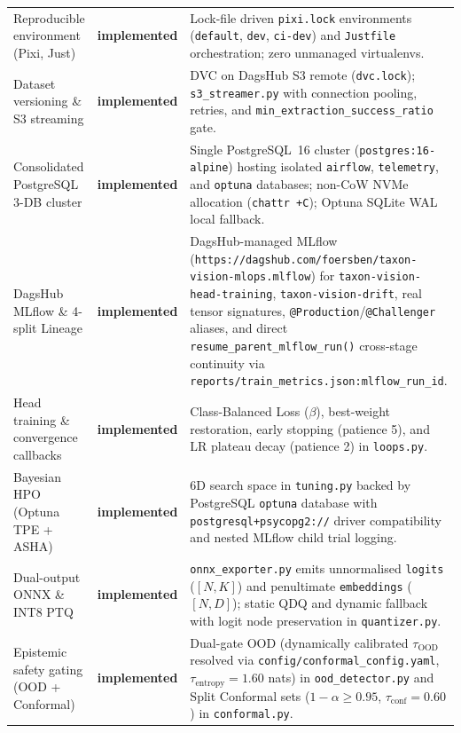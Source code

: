 \begin{longtable}{@{}p{} p{} p{}@{}}
Reproducible environment (Pixi, Just) & \textbf{implemented} & Lock-file driven \texttt{pixi.lock} environments (\texttt{default}, \texttt{dev}, \texttt{ci-dev}) and \texttt{Justfile} orchestration; zero unmanaged virtualenvs. \\
\addlinespace
Dataset versioning \& S3 streaming & \textbf{implemented} & DVC on DagsHub S3 remote (\texttt{dvc.lock}); \texttt{s3\_streamer.py} with connection pooling, retries, and \texttt{min\_extraction\_success\_ratio} gate. \\
\addlinespace
Consolidated PostgreSQL 3-DB cluster & \textbf{implemented} & Single PostgreSQL~16 cluster (\texttt{postgres:16-alpine}) hosting isolated \texttt{airflow}, \texttt{telemetry}, and \texttt{optuna} databases; non-CoW NVMe allocation (\texttt{chattr +C}); Optuna SQLite WAL local fallback. \\
\addlinespace
DagsHub MLflow \& 4-split Lineage & \textbf{implemented} & DagsHub-managed MLflow (\nolinkurl{https://dagshub.com/foersben/taxon-vision-mlops.mlflow}) for \texttt{taxon-vision-head-training}, \texttt{taxon-vision-drift}, real tensor signatures, \texttt{@Production}/\texttt{@Challenger} aliases, and direct \nolinkurl{resume_parent_mlflow_run()} cross-stage continuity via \nolinkurl{reports/train_metrics.json:mlflow_run_id}. \\
\addlinespace
Head training \& convergence callbacks & \textbf{implemented} & Class-Balanced Loss ($\beta$), best-weight restoration, early stopping (patience 5), and LR plateau decay (patience 2) in \texttt{loops.py}. \\
\addlinespace
Bayesian HPO (Optuna TPE + ASHA) & \textbf{implemented} & 6D search space in \texttt{tuning.py} backed by PostgreSQL \texttt{optuna} database with \texttt{postgresql+psycopg2://} driver compatibility and nested MLflow child trial logging. \\
\addlinespace
Dual-output ONNX \& INT8 PTQ & \textbf{implemented} & \texttt{onnx\_exporter.py} emits unnormalised \texttt{logits} ($[N,K]$) and penultimate \texttt{embeddings} ($[N,D]$); static QDQ and dynamic fallback with logit node preservation in \texttt{quantizer.py}. \\
\addlinespace
Epistemic safety gating (OOD + Conformal) & \textbf{implemented} & Dual-gate OOD (dynamically calibrated $\tau_{\text{OOD}}$ resolved via \nolinkurl{config/conformal_config.yaml}, $\tau_{\text{entropy}}=1.60$ nats) in \texttt{ood\_detector.py} and Split Conformal sets ($1-\alpha \ge 0.95$, $\tau_{\text{conf}}=0.60$) in \texttt{conformal.py}. \\

\end{longtable}
